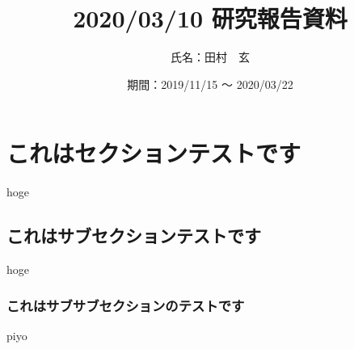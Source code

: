 \documentclass[a4j]{jarticle}
\title{2020/03/10 研究報告資料}
\author{氏名：田村　玄}
\date{期間：2019/11/15 ～ 2020/03/22}
\begin{document}
\maketitle

\section{これはセクションテストです}

hoge

\subsection{これはサブセクションテストです}

hoge

\subsubsection{これはサブサブセクションのテストです}

piyo
\end{document}
